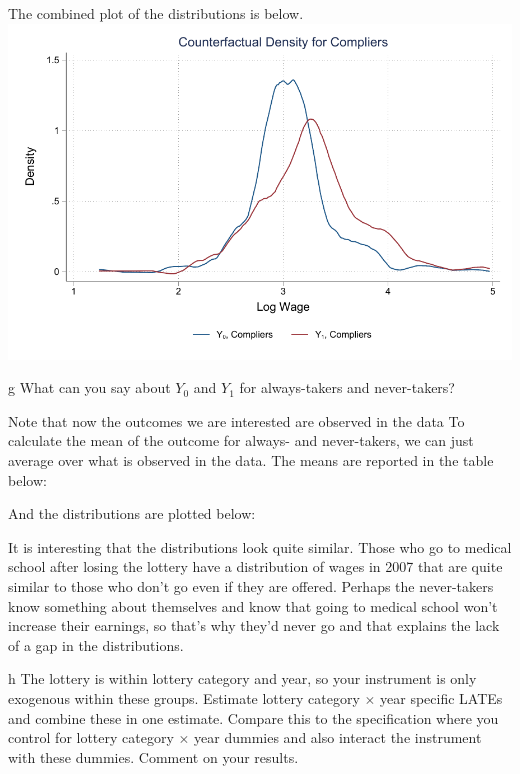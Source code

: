 \documentclass{article}
\begin{document}
\begin{solution}
The combined plot of the distributions is below.
\includegraphics[width=0.5*\textwidth]{ps3/figures/q4_partf_compliers.pdf}



\end{solution}

\begin{problem}{g}
What can you say about $Y_{0}$ and $Y_{1}$ for always-takers and never-takers?
\end{problem}
\begin{solution}
Note that now the outcomes we are interested are observed in the data To calculate the mean of the outcome for always- and never-takers, we can just average over what is observed in the data. The means are reported in the table below:
%

And the distributions are plotted below:

It is interesting that the distributions look quite similar. Those who go to medical school after losing the lottery have a distribution of wages in 2007 that are quite similar to those who don't go even if they are offered. Perhaps the never-takers know something about themselves and know that going to medical school won't increase their earnings, so that's why they'd never go and that explains the lack of a gap in the distributions.
\end{solution}

\begin{problem}{h}
The lottery is within lottery category and year, so your instrument is only exogenous within these groups. Estimate lottery category $\times$ year specific LATEs and combine these in one estimate. Compare this to the specification where you control for lottery category $\times$ year dummies and also interact the instrument with these dummies. Comment on your results.
\end{problem}
\begin{solution}



\end{solution}
\end{document}
